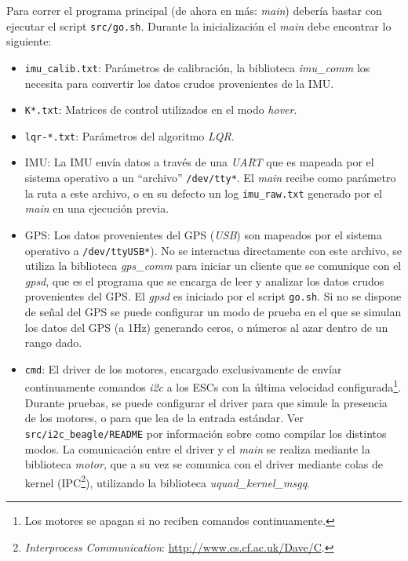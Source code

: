 \documentclass[main]{subfiles}
\begin{document}
Para correr el programa principal (de ahora en más: \textit{main}) deber\'ia bastar con ejecutar el script \verb+src/go.sh+. Durante la inicializaci\'on el \textit{main} debe encontrar lo siguiente:\newline
\vspace{-20pt}

\begin{itemize}
\item \verb+imu_calib.txt+: Par\'ametros de calibraci\'on, la biblioteca \textit{imu\_comm} los necesita para convertir los datos crudos provenientes de la IMU.
\item \verb+K*.txt+: Matrices de control utilizados en el modo \textit{hover}.
\item \verb+lqr-*.txt+: Par\'ametros del algoritmo \textit{LQR}.
\item IMU: La IMU env\'ia datos a trav\'es de una \textit{UART} que es mapeada por el sistema operativo a un ``archivo'' \verb+/dev/tty*+. El \textit{main} recibe como par\'ametro la ruta a este archivo, o en su defecto un log \verb+imu_raw.txt+ generado por el \textit{main} en una ejecuci\'on previa.
\item GPS: Los datos provenientes del GPS  (\textit{USB}) son mapeados por el sistema operativo a \verb+/dev/ttyUSB*+). No se interactua directamente con este archivo, se utiliza la biblioteca \textit{gps\_comm} para iniciar un cliente que se comunique con el \textit{gpsd}, que es el programa que se encarga de leer y analizar los datos crudos provenientes del GPS. El \textit{gpsd} es iniciado por el script \verb+go.sh+.\newline
Si no se dispone de se\~nal del GPS se puede configurar un modo de prueba en el que se simulan los datos del GPS (a 1Hz) generando ceros, o números al azar dentro de un rango dado.
\item \verb+cmd+: El driver de los motores, encargado exclusivamente de env\'iar continuamente comandos \textit{i2c} a los ESCs con la \'ultima velocidad configurada\footnote{Los motores se apagan si no reciben comandos continuamente.}. Durante pruebas, se puede configurar el driver para que simule la presencia de los motores, o para que lea de la entrada est\'andar. Ver \verb+src/i2c_beagle/README+ por informaci\'on sobre como compilar los distintos modos.\newline
La comunicaci\'on entre el driver y el \textit{main} se realiza mediante la biblioteca \textit{motor}, que a su vez se comunica con el driver mediante colas de kernel (IPC\footnote{\textit{Interprocess Communication}: \url{http://www.cs.cf.ac.uk/Dave/C}.}), utilizando la biblioteca \textit{uquad\_kernel\_msgq}.
\end{itemize}
\end{document}
